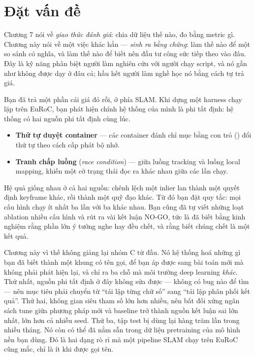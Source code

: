 \documentclass[../../deep_learning.tex]{subfiles}
\begin{document}
\section{Đặt vấn đề}
Chương 7 nói về \emph{giao thức đánh giá}: chia dữ liệu thế nào, đo bằng metric gì. Chương này nói về một việc khác hẳn — \emph{sinh ra bằng chứng}: làm thế nào để một so sánh có nghĩa, và làm thế nào để biết nên đầu tư công sức tiếp theo vào đâu. Đây là kỹ năng phân biệt người làm nghiên cứu với người chạy script, và nó gần như không được dạy ở đâu cả; hầu hết người làm nghề học nó bằng cách tự trả giá.

Bạn đã trả một phần cái giá đó rồi, ở phía SLAM. Khi dựng một harness chạy lặp trên EuRoC, bạn phát hiện chính hệ thống của mình là phi tất định: hệ thống có hai nguồn phi tất định cùng lúc.

\begin{itemize}
\item \textbf{Thứ tự duyệt container} --- các container đánh chỉ mục bằng con trỏ () đổi thứ tự theo cách cấp phát bộ nhớ.
\item \textbf{Tranh chấp luồng} (\emph{race condition}) --- giữa luồng tracking và luồng local mapping, khiến một cờ trạng thái đọc ra khác nhau giữa các lần chạy.
\end{itemize}

Hệ quả giống nhau ở cả hai nguồn: chênh lệch một inlier lan thành một quyết định keyframe khác, rồi thành một quỹ đạo khác. Từ đó bạn đặt quy tắc: mọi cấu hình chạy ít nhất ba lần với ba  khác nhau. Bạn cũng đã tự viết những loạt ablation nhiều cấu hình và rút ra vài kết luận NO-GO, tức là đã biết bằng kinh nghiệm rằng phần lớn ý tưởng nghe hay đều chết, và rằng biết chúng chết là một kết quả.

Chương này vì thế không giảng lại nhóm C từ đầu. Nó hệ thống hoá những gì bạn đã biết thành một khung có tên gọi, để bạn áp được sang bài toán mới mà không phải phát hiện lại, và chỉ ra ba chỗ mà môi trường deep learning \emph{khác}. Thứ nhất, nguồn phi tất định ở đây không sửa được — không có bug nào để tìm — nên mục tiêu phải chuyển từ ``tái lập từng chữ số'' sang ``tái lập phân phối kết quả''. Thứ hai, không gian siêu tham số lớn hơn nhiều, nên bất đối xứng ngân sách tune giữa phương pháp mới và baseline trở thành nguồn kết luận sai lớn nhất, lớn hơn cả nhiễu seed. Thứ ba, tập test bị dùng lại hàng trăm lần trong nhiều tháng. Nó còn có thể đã nằm sẵn trong dữ liệu pretraining của mô hình nền bạn dùng. Đó là hai dạng rò rỉ mà một pipeline SLAM chạy trên EuRoC cũng mắc, chỉ là ít khi được gọi tên.
\end{document}
